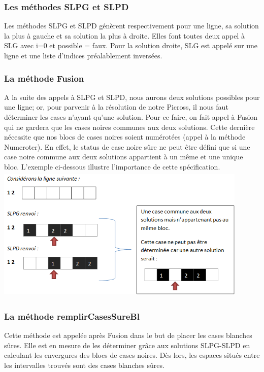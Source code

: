 \documentclass{article}
\begin{document}
\subsubsection{Les méthodes SLPG et SLPD}
Les méthodes SLPG et SLPD génèrent respectivement pour une ligne, sa solution la plus à gauche et sa solution la plus à droite. Elles font toutes deux appel à SLG avec i=0 et possible = faux. 
\newline
Pour la solution droite, SLG est appelé sur une ligne et une liste d'indices préalablement inversées.
\subsubsection{La méthode Fusion}
A la suite des appels à SLPG et SLPD, nous aurons deux solutions possibles pour une ligne; or, pour parvenir à la résolution de notre Picross, il nous faut déterminer les cases n'ayant qu'une solution. 
\newline
Pour ce faire, on fait appel à Fusion qui ne gardera que les cases noires communes aux deux solutions.
Cette dernière nécessite que nos blocs de cases noires soient numérotées (appel à la méthode Numeroter).
\newline
En effet, le status de case noire sûre ne peut être défini que si une case noire commune aux deux solutions appartient à un même et une unique bloc.
\newline
L'exemple ci-dessous illustre l'importance de cette spécification.  
\newline
\includegraphics[height=6.5cm,width=12cm]{Exemple1}
\subsubsection{La méthode remplirCasesSureBl}
Cette méthode est appelée après Fusion dans le but de placer les cases blanches sûres. Elle est en mesure de les déterminer grâce aux solutions SLPG-SLPD en calculant les envergures des blocs de cases noires. Dès lors, les espaces situés entre les intervalles trouvés sont des cases blanches sûres.
\end{document}

